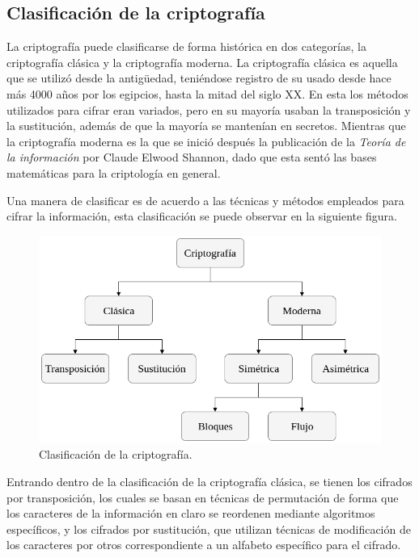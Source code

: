   \subsection{Clasificación de la criptografía}

    La criptografía puede clasificarse de forma histórica en dos categorías,
    la criptografía clásica y la criptografía moderna. La criptografía clásica
    es aquella que se utilizó desde la antigüedad, teniéndose registro de su
    usado desde hace más 4000 años por los egipcios, hasta la mitad del siglo
    XX. En esta los métodos utilizados para cifrar eran variados, pero en su
    mayoría usaban la transposición y la sustitución, además de que la mayoría
    se mantenían en secretos. Mientras que la criptografía moderna es la que
    se inició después la publicación de la \textit{Teoría de la información}
    por Claude Elwood Shannon, dado que esta sentó las bases matemáticas para
    la criptología en general.

    Una manera de clasificar es de acuerdo a las técnicas y métodos empleados
    para cifrar la información, esta clasificación se puede observar en la
    siguiente figura.

    \begin{figure}[H]
      \begin{center}
        \includegraphics[width=0.7\linewidth]
          {contenidos/antecedentes/intro_img/clasificacion_cripto.png}
        \caption{Clasificación de la criptografía.}
      \end{center}
    \end{figure}

    Entrando dentro de la clasificación de la criptografía clásica, se tienen
    los cifrados por transposición, los cuales se basan en técnicas de
    permutación de forma que los caracteres de la información en claro se
    reordenen mediante algoritmos específicos, y los cifrados por sustitución,
    que utilizan técnicas de modificación de los caracteres por otros
    correspondiente a un alfabeto específico para el cifrado.

